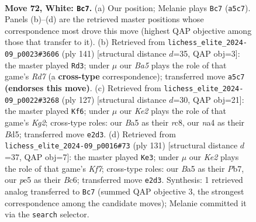 \documentclass[11pt]{article}
\begin{document}
\clearpage

\begin{figure}[p]\centering
\begin{subfigure}{0.46\textwidth}\centering
\resizebox{\linewidth}{!}{%
\newchessgame
\chessboard[
  setfen={1r6/8/B2p1k1p/B3p1b1/n3P2p/5P1R/4K3/8 w - - 13 72},
  showmover=false,
  pgfstyle=straightmove, color=movearrow, markmove={a5-c7}
]}
\caption{}
\end{subfigure}\hfill
\begin{subfigure}{0.46\textwidth}\centering
\resizebox{\linewidth}{!}{%
\newchessgame
\chessboard[
  setfen={8/6pk/5p2/1b6/5BP1/4PPK1/3r4/2R5 b - - 29 71},
  showmover=false,
  pgfstyle=straightmove, color=movearrow, markmove={d2-d3}
]}
\caption{}
\end{subfigure}
\\[4pt]
\begin{subfigure}{0.46\textwidth}\centering
\resizebox{\linewidth}{!}{%
\newchessgame
\chessboard[
  setfen={2R5/3r2k1/3P2p1/3b3p/5B1K/4P1P1/8/8 b - - 12 64},
  showmover=false,
  pgfstyle=straightmove, color=movearrow, markmove={g7-f6}
]}
\caption{}
\end{subfigure}\hfill
\begin{subfigure}{0.46\textwidth}\centering
\resizebox{\linewidth}{!}{%
\newchessgame
\chessboard[
  setfen={3R4/1p6/2b5/P7/3p1r2/1P1B4/1KP2k2/8 b - - 0 66},
  showmover=false,
  pgfstyle=straightmove, color=movearrow, markmove={f2-e3}
]}
\caption{}
\end{subfigure}
\caption{\textbf{Move 72, White: \texttt{Bc7}.} (a) Our position; Melanie plays \texttt{Bc7} (\texttt{a5c7}). Panels (b)--(d) are the retrieved master positions whose correspondence most drove this move (highest QAP objective among those that transfer to it). (b) Retrieved from \texttt{lichess\_elite\_2024-09\_p0023\#3606} (ply 141) [structural distance $d$=35, QAP obj=3]: the master played \texttt{Rd3}; under $\mu$ our \emph{Ba5} plays the role of that game's \emph{Rd7} (a \textbf{cross-type} correspondence); transferred move \texttt{a5c7} \textbf{(endorses this move)}. (c) Retrieved from \texttt{lichess\_elite\_2024-09\_p0022\#3268} (ply 127) [structural distance $d$=30, QAP obj=21]: the master played \texttt{Kf6}; under $\mu$ our \emph{Ke2} plays the role of that game's \emph{Kg2}; cross-type roles: our \emph{B}a5 as their \emph{r}c8, our \emph{n}a4 as their \emph{B}d5; transferred move \texttt{e2d3}. (d) Retrieved from \texttt{lichess\_elite\_2024-09\_p0016\#73} (ply 131) [structural distance $d$=37, QAP obj=7]: the master played \texttt{Ke3}; under $\mu$ our \emph{Ke2} plays the role of that game's \emph{Kf7}; cross-type roles: our \emph{B}a5 as their \emph{P}b7, our \emph{p}e5 as their \emph{B}c6; transferred move \texttt{e2d3}. Synthesis: 1 retrieved analog transferred to \texttt{Bc7} (summed QAP objective 3, the strongest correspondence among the candidate moves); Melanie committed it via the \texttt{search} selector.}
\label{fig:thought-m142}
\end{figure}
\end{document}
